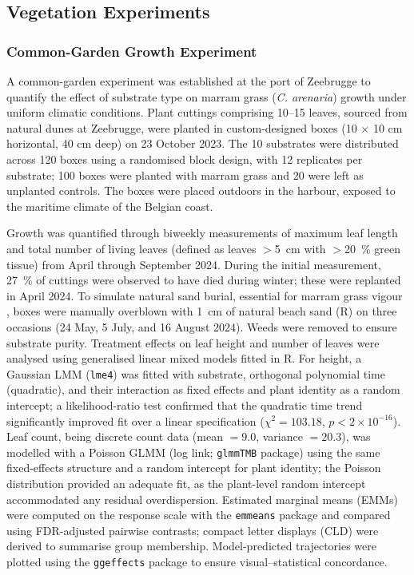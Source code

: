 \documentclass[authoryear,preprint,review,12pt]{elsarticle}
\begin{document}
\subsection{Vegetation Experiments}

\subsubsection{Common-Garden Growth Experiment}

A common-garden experiment was established at the port of Zeebrugge to quantify the effect of substrate type on marram grass (\textit{C. arenaria}) growth under uniform climatic conditions. Plant cuttings comprising 10--15 leaves, sourced from natural dunes at Zeebrugge, were planted in custom-designed boxes (10 $\times$ 10 cm horizontal, 40 cm deep) on 23 October 2023. The 10 substrates were distributed across 120 boxes using a randomised block design, with 12 replicates per substrate; 100 boxes were planted with marram grass and 20 were left as unplanted controls. The boxes were placed outdoors in the harbour, exposed to the maritime climate of the Belgian coast.

Growth was quantified through biweekly measurements of maximum leaf length and total number of living leaves (defined as leaves $>$\SI{5}{\centi\metre} with $>$\SI{20}{\percent} green tissue) from April through September 2024. During the initial measurement, \SI{27}{\percent} of cuttings were observed to have died during winter; these were replanted in April 2024. To simulate natural sand burial, essential for marram grass vigour \citep{disraeli1984effect}, boxes were manually overblown with \SI{1}{\centi\metre} of natural beach sand (R) on three occasions (24 May, 5 July, and 16 August 2024). Weeds were removed to ensure substrate purity. Treatment effects on leaf height and number of leaves were analysed using generalised linear mixed models fitted in R. For height, a Gaussian LMM (\texttt{lme4}) was fitted with substrate, orthogonal polynomial time (quadratic), and their interaction as fixed effects and plant identity as a random intercept; a likelihood-ratio test confirmed that the quadratic time trend significantly improved fit over a linear specification ($\chi^2 = 103.18$, $p < 2 \times 10^{-16}$). Leaf count, being discrete count data (mean $= 9.0$, variance $= 20.3$), was modelled with a Poisson GLMM (log link; \texttt{glmmTMB} package) using the same fixed-effects structure and a random intercept for plant identity; the Poisson distribution provided an adequate fit, as the plant-level random intercept accommodated any residual overdispersion. Estimated marginal means (EMMs) were computed on the response scale with the \texttt{emmeans} package and compared using FDR-adjusted pairwise contrasts; compact letter displays (CLD) were derived to summarise group membership. Model-predicted trajectories were plotted using the \texttt{ggeffects} package to ensure visual--statistical concordance.
\end{document}
